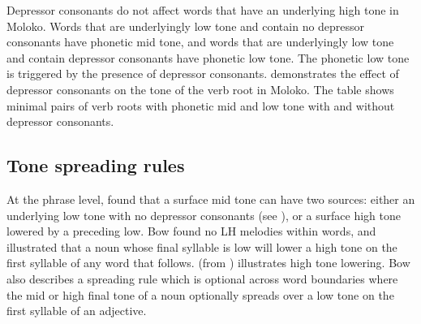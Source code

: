 Depressor consonants do not affect words that have an underlying high tone in Moloko. Words that are underlyingly low tone and contain no depressor consonants have phonetic mid tone, and words that are underlyingly low tone and contain depressor consonants have phonetic low tone. The phonetic low tone is triggered by the presence of depressor consonants.   demonstrates the effect of depressor consonants on the tone of the verb root in Moloko. The table shows minimal pairs of verb roots with phonetic mid and low tone with and without depressor consonants. 

\begin{table}
\caption{Effect of depressor consonants on tone of verb root\label{tab:2.13}}
\end{table}

\subsection{Tone spreading rules}\label{sec:2.4.2}
\hypertarget{RefHeading1210661525720847}{}
At the phrase level, \citet{Bow1997c} found that a surface mid tone can have two sources: either an underlying low tone with no depressor consonants (see ), or a surface high tone lowered by a preceding low.  Bow found no LH melodies within words, and illustrated that a noun whose final syllable is low will lower a high tone on the first syllable of any word that follows.  (from \citealt{Bow1997c}) illustrates high tone lowering. Bow also describes a spreading rule which is optional across word boundaries where the mid or high final tone of a noun optionally spreads over a low tone on the first syllable of an adjective. 

